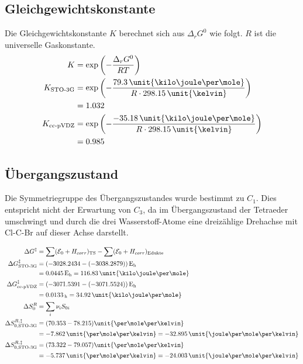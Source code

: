 \subsection{Gleichgewichtskonstante}

Die Gleichgewichtskonstante $K$ berechnet sich aus $\Delta_r G^0$ wie folgt. $R$ ist die universelle Gaskonstante.
\begin{align*}
                    K &= \exp\left(- \frac{\Delta_r G^0}{RT} \right) \\
    K_{\text{STO-3G}} &= \exp\left(- \frac{79.3\, \text{\unit{\kilo\joule\per\mole}}}{R \cdot 298.15\, \text{\unit{\kelvin}}} \right) \\
                      &= 1.032 \\
   K_{\text{cc-pVDZ}} &= \exp\left(- \frac{-35.18\, \text{\unit{\kilo\joule\per\mole}}}{R \cdot 298.15\, \text{\unit{\kelvin}}} \right) \\
                      &= 0.985
\end{align*}

\subsection{Übergangszustand}

Die Symmetriegruppe des Übergangszustandes wurde bestimmt zu $C_1$.
Dies entspricht nicht der Erwartung von $C_3$, da im Übergangszustand der Tetraeder umschwingt und durch die drei Wasserstoff-Atome eine dreizählige Drehachse mit Cl-C-Br auf dieser Achse darstellt.

\begin{align*}
    \Delta G^{\ddagger} &= \sum (\mathcal{E}_0 + H_{corr})_{\text{TS}} - \sum (\mathcal{E}_0 + H_{corr})_{\text{Edukte}} \\
    \Delta G^{\ddagger}_{\text{STO-3G}} &= (- 3028.2434 - (- 3038.2879))\, \text{E\textsubscript{h}} \\
                                        &= 0.0445\, \text{E\textsubscript{h}} = 116.83\, \text{\unit{\kilo\joule\per\mole}} \\
   \Delta G^{\ddagger}_{\text{cc-pVDZ}} &= (- 3071.5391 - (- 3071.5524))\, \text{E\textsubscript{h}} \\
                                        &= 0.0133\, \text{\textsubscript{h}} = 34.92\, \text{\unit{\kilo\joule\per\mole}} \\
                               \Delta S_0^R &= \sum_i \nu_i S_{0i} \\
    \Delta S_{0,\text{STO-3G}}^{R,\ddagger} &= (70.353 - 78.215) \text{\unit{\cal\per\mole\per\kelvin}} \\
                                            &= - 7.862\, \text{\unit{\cal\per\mole\per\kelvin}} = - 32.895\, \text{\unit{\joule\per\mole\per\kelvin}} \\
    \Delta S_{0,\text{STO-3G}}^{R,\ddagger} &= (73.322 - 79.057) \text{\unit{\cal\per\mole\per\kelvin}} \\
                                            &= - 5.737\, \text{\unit{\cal\per\mole\per\kelvin}} = - 24.003\, \text{\unit{\joule\per\mole\per\kelvin}} \\          
\end{align*}

